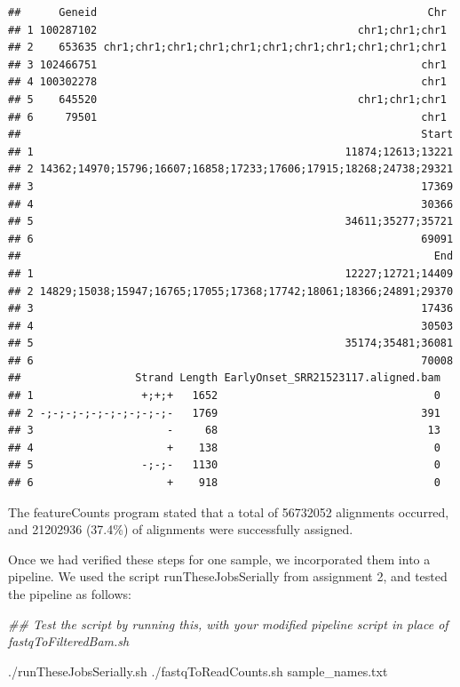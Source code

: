 \documentclass[
]{article}
\newenvironment{Shaded}{\begin{snugshade}}{\end{snugshade}}
\newcommand{\CommentTok}[1]{\textcolor[rgb]{0.56,0.35,0.01}{\textit{#1}}}
\newcommand{\ExtensionTok}[1]{#1}
\newcommand{\NormalTok}[1]{#1}
\begin{document}
\begin{verbatim}
##      Geneid                                                    Chr
## 1 100287102                                         chr1;chr1;chr1
## 2    653635 chr1;chr1;chr1;chr1;chr1;chr1;chr1;chr1;chr1;chr1;chr1
## 3 102466751                                                   chr1
## 4 100302278                                                   chr1
## 5    645520                                         chr1;chr1;chr1
## 6     79501                                                   chr1
##                                                               Start
## 1                                                 11874;12613;13221
## 2 14362;14970;15796;16607;16858;17233;17606;17915;18268;24738;29321
## 3                                                             17369
## 4                                                             30366
## 5                                                 34611;35277;35721
## 6                                                             69091
##                                                                 End
## 1                                                 12227;12721;14409
## 2 14829;15038;15947;16765;17055;17368;17742;18061;18366;24891;29370
## 3                                                             17436
## 4                                                             30503
## 5                                                 35174;35481;36081
## 6                                                             70008
##                  Strand Length EarlyOnset_SRR21523117.aligned.bam
## 1                 +;+;+   1652                                  0
## 2 -;-;-;-;-;-;-;-;-;-;-   1769                                391
## 3                     -     68                                 13
## 4                     +    138                                  0
## 5                 -;-;-   1130                                  0
## 6                     +    918                                  0
\end{verbatim}

The featureCounts program stated that a total of 56732052 alignments
occurred, and 21202936 (37.4\%) of alignments were successfully
assigned.

Once we had verified these steps for one sample, we incorporated them
into a pipeline. We used the script runTheseJobsSerially from assignment
2, and tested the pipeline as follows:

\begin{Shaded}
\begin{Highlighting}[]
\CommentTok{\#\# Test the script by running this, with your modified pipeline script in place of fastqToFilteredBam.sh}

\ExtensionTok{./runTheseJobsSerially.sh}\NormalTok{ ./fastqToReadCounts.sh sample\_names.txt}
\end{Highlighting}
\end{Shaded}
\end{document}
